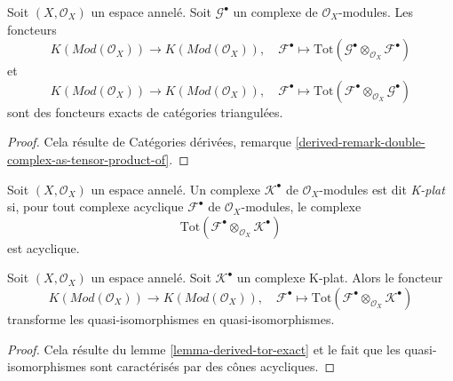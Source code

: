 \begin{lemma}

\label{lemma-derived-tor-exact}
Soit $(X, \mathcal{O}_X)$ un espace annelé. Soit $\mathcal{G}^\bullet$ un complexe de $\mathcal{O}_X$-modules. Les foncteurs $$
K(\textit{Mod}(\mathcal{O}_X))
\longrightarrow
K(\textit{Mod}(\mathcal{O}_X)),
\quad
\mathcal{F}^\bullet \longmapsto
\text{Tot}(\mathcal{G}^\bullet \otimes_{\mathcal{O}_X} \mathcal{F}^\bullet)
$$ et $$
K(\textit{Mod}(\mathcal{O}_X))
\longrightarrow
K(\textit{Mod}(\mathcal{O}_X)),
\quad
\mathcal{F}^\bullet \longmapsto
\text{Tot}(\mathcal{F}^\bullet \otimes_{\mathcal{O}_X} \mathcal{G}^\bullet)
$$ sont des foncteurs exacts de catégories triangulées.
\end{lemma}

\begin{proof}
Cela résulte de Catégories dérivées, remarque \ref{derived-remark-double-complex-as-tensor-product-of}.
\end{proof}

\begin{definition}

\label{definition-K-flat}

Soit $(X, \mathcal{O}_X)$ un espace annelé. Un complexe $\mathcal{K}^\bullet$ de $\mathcal{O}_X$-modules est dit {\it K-plat} si, pour tout complexe acyclique $\mathcal{F}^\bullet$
de $\mathcal{O}_X$-modules, le complexe
$$
\text{Tot}(\mathcal{F}^\bullet \otimes_{\mathcal{O}_X} \mathcal{K}^\bullet)
$$
est acyclique.

\end{definition}

\begin{lemma}

\label{lemma-K-flat-quasi-isomorphism}

Soit $(X, \mathcal{O}_X)$ un espace annelé. Soit $\mathcal{K}^\bullet$ un complexe K-plat. Alors le foncteur
$$
K(\textit{Mod}(\mathcal{O}_X))
\longrightarrow
K(\textit{Mod}(\mathcal{O}_X)), \quad
\mathcal{F}^\bullet
\longmapsto
\text{Tot}(\mathcal{F}^\bullet \otimes_{\mathcal{O}_X} \mathcal{K}^\bullet)
$$
transforme les quasi-isomorphismes en quasi-isomorphismes.

\end{lemma}

\begin{proof}

Cela résulte du lemme \ref{lemma-derived-tor-exact}
et le fait que les quasi-isomorphismes sont caractérisés par des cônes acycliques.

\end{proof}

